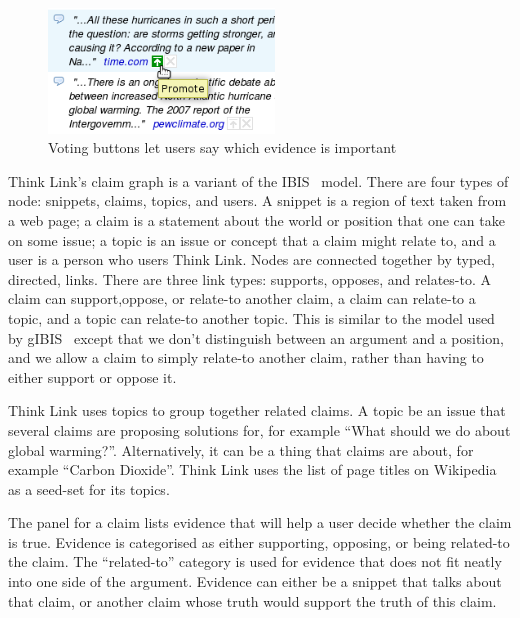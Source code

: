 \documentclass{chi2009}
\newcommand{\todo}[1]{}
\begin{document}
\begin{figure}[tb]
	\begin{center}
	\includegraphics[width=6cm]{../screenshots/v2_vote.png}
	\caption{Voting buttons let users say which evidence is important}
	\label{voting}
	\end{center}
\end{figure}


Think Link's claim graph is a variant of the IBIS~\cite{Rittel1973} model. There are four types of node: snippets, claims, topics, and users. A snippet is a region of text taken from a web page; a claim is a statement about the world or position that one can take on some issue; a topic is an issue or concept that a claim might relate to, and a user is a person who users Think Link. Nodes are connected together by typed, directed, links. There are three link types: supports, opposes, and relates-to. A claim can support,oppose, or relate-to another claim, a claim can relate-to a topic, and a topic can relate-to another topic. This is similar to the model used by gIBIS~\cite{Conklin1987} except that we don't distinguish between an argument and a position, and we allow a claim to simply relate-to another claim, rather than having to either support or oppose it.

Think Link uses topics to group together related claims. A topic be an issue that several claims are proposing solutions for, for example ``What should we do about global warming?''. Alternatively, it can be a thing that claims are about, for example ``Carbon Dioxide''. Think Link uses the list of page titles on Wikipedia as a seed-set for its topics.

The panel for a claim lists evidence that will help a user decide whether the claim is true. Evidence is categorised as either supporting, opposing, or being related-to the claim. The ``related-to'' category is used for evidence that does not fit neatly into one side of the argument. Evidence can either be a snippet that talks about that claim, or another claim whose truth would support the truth of this claim. 
\end{document}
